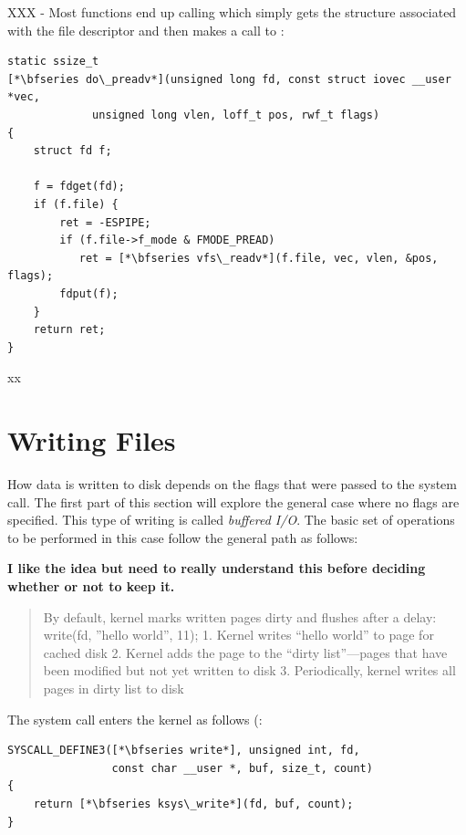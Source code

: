 \noindent
XXX - Most functions end up calling  which simply gets the  structure associated with the file descriptor and then makes a call to :

\begin{lstlisting}
static ssize_t 
[*\bfseries do\_preadv*](unsigned long fd, const struct iovec __user *vec,
             unsigned long vlen, loff_t pos, rwf_t flags)
{       
    struct fd f;
        
    f = fdget(fd);
    if (f.file) {
        ret = -ESPIPE;
        if (f.file->f_mode & FMODE_PREAD)
           ret = [*\bfseries vfs\_readv*](f.file, vec, vlen, &pos, flags);
        fdput(f);
    }
    return ret;
}
\end{lstlisting}

\noindent
xx


\section{Writing Files}

How data is written to disk depends on the flags that were passed to the  system call. The first part of this section will explore the general case where no flags are specified. This type of writing is called \textit{buffered I/O}. The basic set of operations to be performed in this case follow the general path as follows:

\textbf{I like the idea but need to really understand this before deciding whether or not to keep it.}

\begin{quote}
By default, kernel marks written pages dirty and flushes after a delay:
write(fd, ”hello world”, 11);
1. Kernel writes “hello world” to page for cached disk
2. Kernel adds the page to the “dirty list”—pages that have been modified but not yet written to disk
3. Periodically, kernel writes all pages in dirty list to disk
\end{quote}

\noindent
The  system call enters the kernel as follows (:

\begin{lstlisting}
SYSCALL_DEFINE3([*\bfseries write*], unsigned int, fd, 
                const char __user *, buf, size_t, count)
{
    return [*\bfseries ksys\_write*](fd, buf, count);
}
\end{lstlisting}

